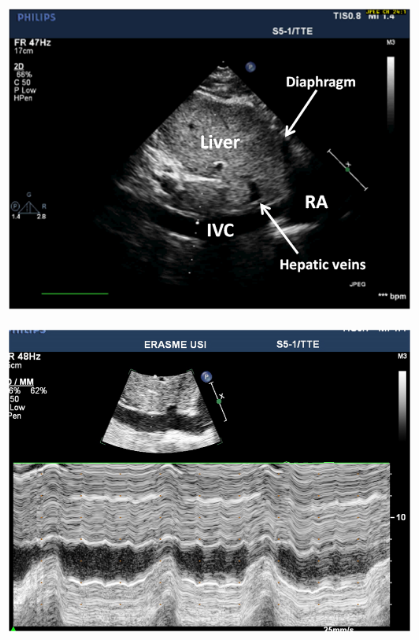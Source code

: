 \documentclass{beamer}
\begin{document}
			\begin{frame}
				\begin{figure}
					\centering
					\includegraphics[width=0.95\textwidth]{figures/ivc-view-labeled}
					\label{fig:fluidstrategy}
				\end{figure}
			\end{frame}
			\begin{frame}
				\begin{figure}
					\centering
					\includegraphics[width=0.95\textwidth]{figures/ivc-respiratory-variation}
					\label{fig:fluidstrategy}
				\end{figure}
			\end{frame}
\end{document}
